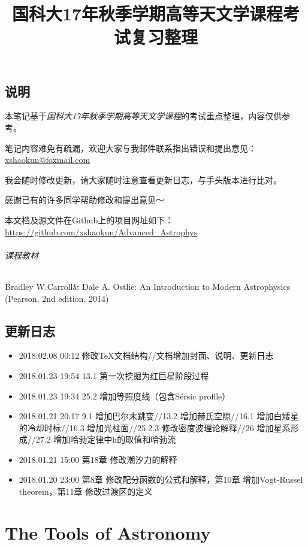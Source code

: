 \documentclass[openany]{ctexbook}
\title{国科大17年秋季学期高等天文学课程考试复习整理}
\begin{document}
\maketitle
\begin{frontmatter}
\chapter{说明}
本笔记基于\emph{国科大17年秋季学期高等天文学课程}的考试重点整理，内容仅供参考。

笔记内容难免有疏漏，欢迎大家与我邮件联系指出错误和提出意见：
\href{mailto:xshaokun@foxmail.com}{xshaokun@foxmail.com}

我会随时修改更新，请大家随时注意查看更新日志，与手头版本进行比对。

感谢已有的许多同学帮助修改和提出意见～

本文档及源文件在Github上的项目网址如下：
\url{https://github.com/xshaokun/Advanced_Astrophys}

\paragraph{课程教材}
Bradley W.Carroll\& Dale A. Ostlie: An Introduction to Modern Astrophysics (Pearson, 2nd edition, 2014)

\chapter{更新日志}
\begin{itemize}
	\item 2018.02.08 00:12 修改\TeX 文档结构//文档增加封面、说明、更新日志
	\item 2018.01.23 19:54 13.1 第一次挖掘为红巨星阶段过程
	\item 2018.01.23 19:34 25.2 增加等照度线（包含Sérsic profile）
	\item 2018.01.21 20:17 9.1 增加巴尔末跳变//13.2 增加赫氏空隙//16.1 增加白矮星的冷却时标//16.3 增加光柱面//25.2.3 修改密度波理论解释//26 增加星系形成//27.2 增加哈勃定律中h的取值和哈勃流
	\item 2018.01.21 15:00 第18章 修改潮汐力的解释
	\item 2018.01.20 23:00 第8章 修改配分函数的公式和解释，第10章 增加Vogt-Russel theorem，第11章 修改过渡区的定义
\end{itemize}
\end{frontmatter}

\tableofcontents
\listoffigures
\mainmatter
\part{The Tools of Astronomy}






\end{document}
